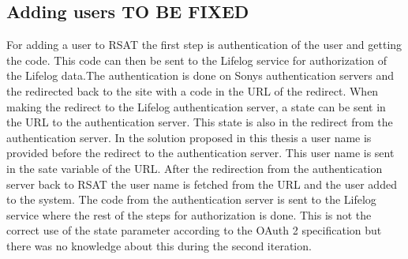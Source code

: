 \documentclass{cslthse-msc}
\begin{document}
\subsection{Adding users TO BE FIXED}


For adding a user to RSAT the first step is authentication of the user and getting the code. This code can then be sent to the Lifelog service for authorization of the Lifelog data.The authentication is done on Sonys authentication servers and the redirected back to the site with a code in the URL of the redirect. When making the redirect to the Lifelog authentication server, a state can be sent in the URL to the authentication server. This state is also in the redirect from the authentication server. In the solution proposed in this thesis a user name is provided before  the redirect to the authentication server. This user name is sent in the sate variable of the URL. After the redirection from the authentication server back to RSAT the user name is fetched from the URL and the user added to the system. The code from the authentication server is sent to the Lifelog service where the rest of the steps for authorization is done. This is not the correct use of the state parameter according to the OAuth 2 specification but there was no knowledge about this during the second iteration.


\end{document}
